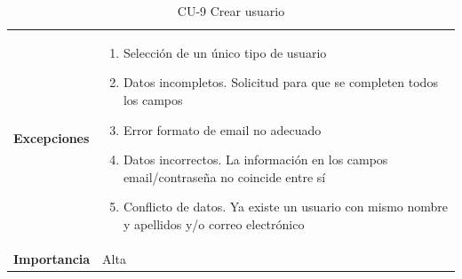 \begin{table}[p]
\begin{tabularx}{\linewidth}{ p{} p{} }
		\textbf{Excepciones}          & 
            \begin{enumerate}
    			\def\labelenumi{\arabic{enumi}.}
    			\tightlist
    			\item Selección de un único tipo de usuario 
                \item Datos incompletos. Solicitud para que se completen todos los campos 
                \item Error formato de email no adecuado
                \item Datos incorrectos. La información en los campos email/contraseña no coincide entre sí
                \item Conflicto de datos. Ya existe un usuario con mismo nombre y apellidos y/o correo electrónico
    		\end{enumerate}\\
		\textbf{Importancia}          & Alta \\
		\bottomrule
	\end{tabularx}
	\caption{CU-9 Crear usuario}
    \label{CU-9}
\end{table}

